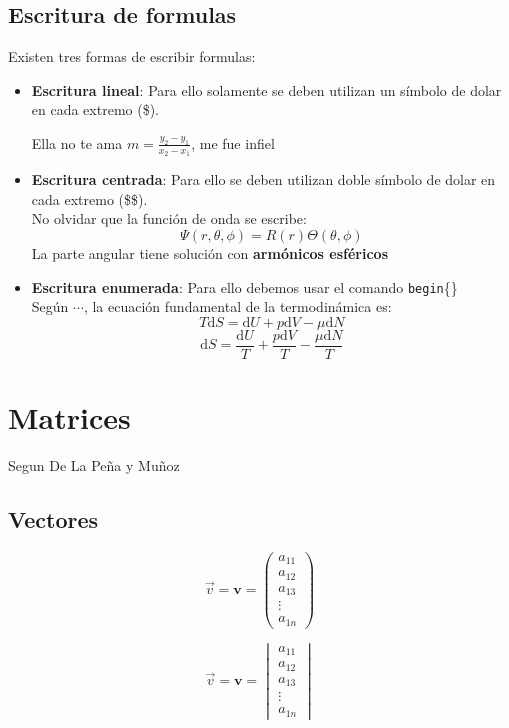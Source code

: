 \subsection*{Escritura de formulas}\label{formulas}
Existen tres formas de escribir formulas:\begin{itemize}
\item \textbf{Escritura lineal}: Para ello solamente se deben utilizan un símbolo de dolar en cada extremo (\$).\begin{center}
Ella no te ama $m=\frac{y_2-y_1}{x_2-x_1}$, me fue infiel
\end{center}


\item \textbf{Escritura centrada}: Para ello se deben utilizan doble símbolo de dolar en cada extremo (\$\$).\\[0.2cm]
No olvidar que la función de onda se escribe: $$\Psi(r,\theta,\phi)=R(r)\Theta (\theta,\phi)$$ La parte angular tiene solución con \textbf{armónicos esféricos}

\item \textbf{Escritura enumerada}: Para ello debemos usar el comando \texttt{begin}\{\}\\[0.2cm]
Según $\cdots$, la ecuación fundamental de la termodinámica es:\begin{equation}
T\text{d}S=\text{d}U+p\text{d}V-\mu\text{d}N
\end{equation}
$$\text{d}S=\frac{\text{d}U}{T}+\frac{p\text{d}V}{T}-\frac{\mu\text{d}N}{T}$$
\end{itemize}

\section{Matrices}\label{matriz}
Segun De La Peña \cite{DLP} y Muñoz \cite{MJM}
\subsection*{Vectores}
$$\vec{v}=\textbf{v}=\begin{pmatrix}
a_{11} \\ a_{12} \\ a_{13} \\ \vdots \\ a_{1n}
\end{pmatrix}$$

$$\vec{v}=\textbf{v}=\begin{vmatrix}
a_{11} \\ a_{12} \\ a_{13} \\ \vdots \\ a_{1n}
\end{vmatrix}$$

